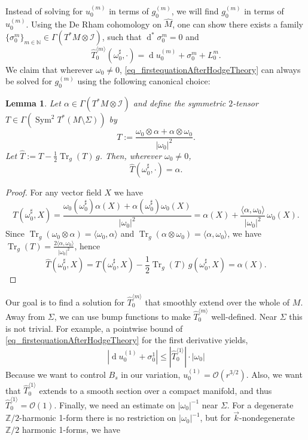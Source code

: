 \documentclass[11pt]{amsart}
\newcommand{\N}{\mathbb{N}}
\newcommand{\ZT}{\mathbb{Z}/2}
\newcommand{\Tr}{\operatorname{Tr}}
\newcommand{\Sym}{\operatorname{Sym}}
\renewcommand{\d}{\operatorname{d}}
\renewcommand{\O}{\mathcal{O}}
\newtheorem{lemma}[theorem]{Lemma}
\newcommand{\MI}{\mathcal{I}}
\begin{document}
Instead of solving for $u^{(m)}_0$ in terms of $g^{(m)}_0$, we will find $g^{(m)}_0$ in terms of $u^{(m)}_0$. Using the De Rham cohomology on $\widehat{M}$, one can show there exists a family $\{\sigma^{ m }_0\}_{m \in \N} \in \Gamma(T^*M \otimes \mathcal{I})$, such that $\d^* \!\sigma^{ m }_0 = 0$ and
\begin{equation}
	\label{eq_firstequationAfterHodgeTheory}
	\widehat T^{\langle m\rangle}_0(\omega_0^\sharp,\cdot) =
	\d u_0^{(m)} + \sigma^{ m }_0 + L^m_0.
\end{equation}
We claim that wherever $\omega_0 \not = 0$, \eqref{eq_firstequationAfterHodgeTheory} can always be solved for $g^{(m)}_0$ using the following canonical choice:
\begin{lemma}\label{lem:canonical-choice-hat-T}
	Let $\alpha\in \Gamma(T^*M \otimes \MI)$ and define the symmetric $2$-tensor
	$T\in \Gamma(\Sym^2 T^*(M\setminus\Sigma))$ by
	\[
	T := \frac{\omega_0\otimes \alpha + \alpha\otimes \omega_0}{|\omega_0|^2} .
	\]
	Let $\widehat T := T-\frac12 \Tr_g(T)\,g$. Then, wherever $\omega_0 \not = 0$,
	\[
	\widehat T(\omega_0^\sharp,\cdot)=\alpha .
	\]
\end{lemma}
\begin{proof}
	For any vector field $X$ we have
	\[
	T(\omega_0^\sharp,X)= 
	\frac{\omega_0(\omega_0^\sharp)\alpha(X)+\alpha(\omega_0^\sharp)\omega_0(X)}{|\omega_0|^{2}}
	=\alpha(X)+ \frac{\langle \alpha,\omega_0\rangle}{|\omega_0|^{2}}\,\omega_0(X).
	\]
	Since $\Tr_g(\omega_0\otimes\alpha)=\langle \omega_0,\alpha\rangle$ and $\Tr_g(\alpha\otimes\omega_0)=\langle \alpha,\omega_0\rangle$,
	we have $\Tr_g(T)=\frac{2\langle \alpha,\omega_0\rangle}{|\omega_0|^2}$, hence
	\[
	\widehat T(\omega_0^\sharp,X)
	=
	T(\omega_0^\sharp,X)-\frac12\Tr_g(T)\,g(\omega_0^\sharp,X)
	=
	\alpha(X).
	\]
\end{proof}
Our goal is to find a solution for $\widehat{T}_0^{\langle m \rangle}$ that smoothly extend over the whole of $M$. Away from $\Sigma$, we can use bump functions to make $\widehat{T}_0^{\langle m \rangle}$ well-defined. Near $\Sigma$ this is not trivial. For example, a pointwise bound of \eqref{eq_firstequationAfterHodgeTheory} for the first derivative yields,
$$
\left|\d u_0^{(1)} + \sigma^{1}_0\right| \le |\widehat{T}^{\langle1 \rangle}_0| \cdot |\omega_0|
$$
Because we want to control $B_s$ in our variation, $u^{(1)}_0 = \O(r^{3/2})$. Also, we want that $\widehat{T}^{\langle 1 \rangle}_0$ extends to a smooth section over a compact manifold, and thus $\widehat{T}^{\langle 1 \rangle}_0 = \O(1)$. Finally, we need an estimate on $|\omega_0|^{-1}$ near $\Sigma$. For a degenerate $\ZT$-harmonic 1-form there is no restriction on $|\omega_0|^{-1}$, but for $\vec{k}$-nondegenerate $\ZT$ harmonic 1-forms, we have
\end{document}
